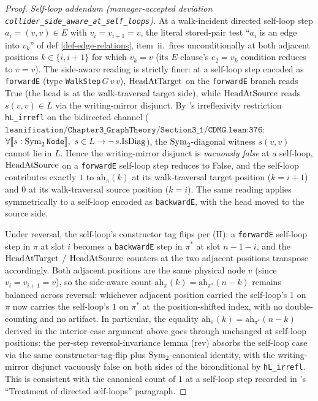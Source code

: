 \documentclass[main]{subfiles}
\begin{document}
\begin{proof}
\smallskip\noindent\emph{Self-loop addendum (manager-accepted deviation \texttt{collider\_side\_aware\_at\_self\_loops}).}
At a walk-incident directed self-loop step $a_i = (v, v) \in E$ with $v_i = v_{i+1} = v$, the literal stored-pair test ``$a_i$ is an edge into $v_k$'' of def \ref{def-edge-relations}, item~ii.\ fires unconditionally at both adjacent positions $k \in \{i, i + 1\}$ for which $v_k = v$ (its $E$-clause's $e_2 = v_k$ condition reduces to $v = v$). The side-aware reading is strictly finer: at a self-loop step encoded as \texttt{forwardE} (type \texttt{WalkStep}$\,G\,v\,v$), $\mathrm{HeadAtTarget}$ on the \texttt{forwardE} branch reads True (the head is at the walk-traversal target side), while $\mathrm{HeadAtSource}$ reads $s(v, v) \in L$ via the writing-mirror disjunct. By 's irreflexivity restriction \texttt{hL\_irrefl} on the bidirected channel ($\texttt{leanification/Chapter3\_GraphTheory/Section3\_1/CDMG.lean:376}$: $\forall \llbracket s : \mathrm{Sym}_2\,\texttt{Node} \rrbracket,\ s \in L \to \neg\, s.\mathrm{IsDiag}$), the $\mathrm{Sym}_2$-diagonal witness $s(v, v)$ cannot lie in $L$. Hence the writing-mirror disjunct is \emph{vacuously false} at a self-loop, $\mathrm{HeadAtSource}$ on a \texttt{forwardE} self-loop step reduces to False, and the self-loop contributes exactly $1$ to $\mathrm{ah}_\pi(k)$ at its walk-traversal target position ($k = i + 1$) and $0$ at its walk-traversal source position ($k = i$). The same reading applies symmetrically to a self-loop encoded as \texttt{backwardE}, with the head moved to the source side.

Under reversal, the self-loop's constructor tag flips per (II): a \texttt{forwardE} self-loop step in $\pi$ at slot $i$ becomes a \texttt{backwardE} step in $\pi^*$ at slot $n - 1 - i$, and the $\mathrm{HeadAtTarget}$ / $\mathrm{HeadAtSource}$ counters at the two adjacent positions transpose accordingly. Both adjacent positions are the same physical node $v$ (since $v_i = v_{i+1} = v$), so the side-aware count $\mathrm{ah}_{\pi}(k) = \mathrm{ah}_{\pi^*}(n - k)$ remains balanced across reversal: whichever adjacent position carried the self-loop's $1$ on $\pi$ now carries the self-loop's $1$ on $\pi^*$ at the position-shifted index, with no double-counting and no artifact. In particular, the equality $\mathrm{ah}_\pi(k) = \mathrm{ah}_{\pi^*}(n - k)$ derived in the interior-case argument above goes through unchanged at self-loop positions: the per-step reversal-invariance lemma (rev) absorbs the self-loop case via the same constructor-tag-flip plus $\mathrm{Sym}_2$-canonical identity, with the writing-mirror disjunct vacuously false on both sides of the biconditional by \texttt{hL\_irrefl}. This is consistent with the canonical count of $1$ at a self-loop step recorded in 's ``Treatment of directed self-loops'' paragraph.


\end{proof}
\end{document}
